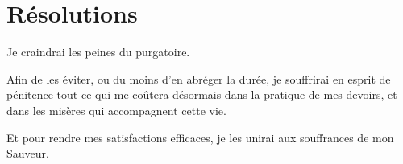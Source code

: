 \documentclass[instructions.tex]{subfiles}
\begin{document}
\section{Résolutions}
 
\primo Je craindrai les peines du purgatoire.

\secundo Afin de les éviter, ou du moins d’en abréger la durée, je souffrirai en esprit de pénitence tout ce qui me coûtera désormais dans la pratique de mes devoirs, et dans les misères qui accompagnent cette vie.

\tertio Et pour rendre mes satisfactions efficaces, je les unirai aux souffrances de mon Sauveur. 

 
\end{document}
